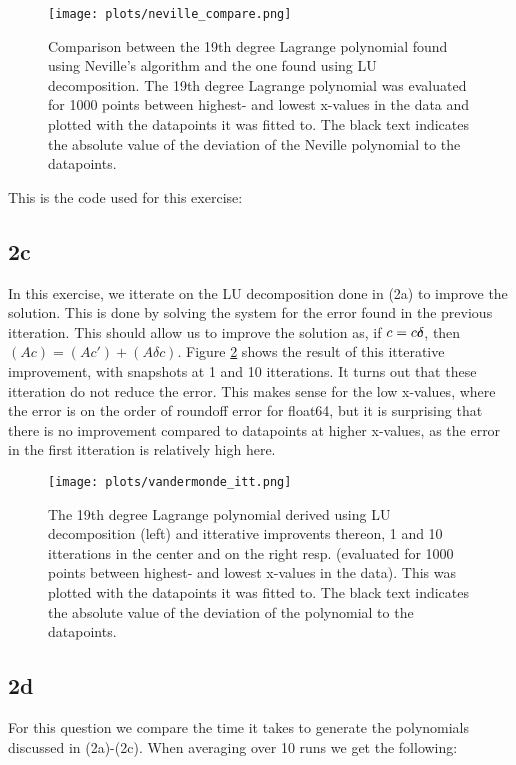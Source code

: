 \begin{figure}
    \centering
    \texttt{[image: plots/neville\_compare.png]}
    \caption{Comparison between the 19th degree Lagrange polynomial found
    using Neville's algorithm and the one found using LU decomposition. The 
    19th degree Lagrange polynomial was evaluated for 1000 points between 
    highest- and lowest x-values in the data and plotted with the datapoints 
    it was fitted to. The black text indicates the absolute value of the 
    deviation of the Neville polynomial to the datapoints.}
    \label{fig:neville}
\end{figure}

\noindent
This is the code used for this exercise:


\subsection*{2c}
In this exercise, we itterate on the LU decomposition done in (2a) to improve
the solution. This is done by solving the system for the error found in the
previous itteration. This should allow us to improve the solution as, if $c=c\mathaccent+\delta c$,
then $(A c)=(A c')+(A \delta c)$.
Figure \ref{fig:lu_itt} shows the result of this itterative improvement, with
snapshots at 1 and 10 itterations.
It turns out that these itteration do not reduce the error. This makes sense for the low x-values, where the error is on the
order of roundoff error for float64, but it is surprising that there is no improvement compared to datapoints at higher x-values,
as the error in the first itteration is relatively high here.

\begin{figure}
    \centering
    \texttt{[image: plots/vandermonde\_itt.png]}
    \caption{The 19th degree Lagrange polynomial derived using LU 
    decomposition (left) and itterative improvents thereon, 1 and 10 
    itterations in the center and on the right resp. (evaluated for 1000 
    points between highest- and lowest x-values in the data). This was 
    plotted with the datapoints it was fitted to. The black text indicates 
    the absolute value of the deviation of the polynomial to the datapoints.}
    \label{fig:lu_itt}
\end{figure}

\subsection*{2d}
For this question we compare the time it takes to generate the polynomials
discussed in (2a)-(2c). When averaging over 10 runs we get the following:

